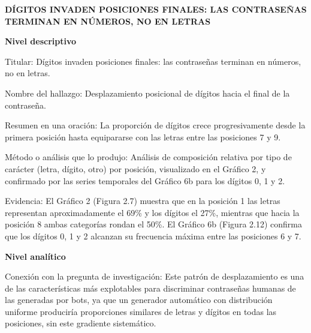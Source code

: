 \documentclass[12pt, letterpaper]{article}
\begin{document}
\begin{center}
    \vspace{0.8cm}
    {\Large \bfseries DÍGITOS INVADEN POSICIONES FINALES: LAS CONTRASEÑAS TERMINAN EN NÚMEROS, NO EN LETRAS} \\
    \vspace{0.4cm}
\end{center}

\vspace{1.5cm}

\noindent
\textbf{Nivel descriptivo} \newline

\noindent
Titular: Dígitos invaden posiciones finales: las contraseñas terminan en números, no en letras. \newline

\noindent
Nombre del hallazgo: Desplazamiento posicional de dígitos hacia el final de la contraseña. \newline

\noindent
Resumen en una oración: La proporción de dígitos crece progresivamente desde la primera posición hasta equipararse con las letras entre las posiciones 7 y 9. \newline

\noindent
Método o análisis que lo produjo: Análisis de composición relativa por tipo de carácter (letra, dígito, otro) por posición, visualizado en el Gráfico 2, y confirmado por las series temporales del Gráfico 6b para los dígitos 0, 1 y 2. \newline

\noindent
Evidencia: El Gráfico 2 (Figura 2.7) muestra que en la posición 1 las letras representan aproximadamente el 69\% y los dígitos el 27\%, mientras que hacia la posición 8 ambas categorías rondan el 50\%. El Gráfico 6b (Figura 2.12) confirma que los dígitos 0, 1 y 2 alcanzan su frecuencia máxima entre las posiciones 6 y 7.
\newpage

\noindent
\textbf{Nivel analítico} \newline

\noindent
Conexión con la pregunta de investigación: Este patrón de desplazamiento es una de las características más explotables para discriminar contraseñas humanas de las generadas por bots, ya que un generador automático con distribución uniforme produciría proporciones similares de letras y dígitos en todas las posiciones, sin este gradiente sistemático. \newline
\end{document}
